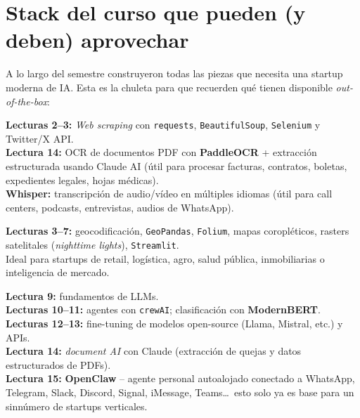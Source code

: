 \documentclass[11pt,a4paper]{article}
\begin{document}
\section{Stack del curso que pueden (y deben) aprovechar}\label{sec:tooling}

A lo largo del semestre construyeron todas las piezas que necesita una startup
moderna de IA. Esta es la chuleta para que recuerden qu\'e tienen disponible
\emph{out-of-the-box}:

\begin{tcolorbox}[ycbox={Datos e ingesta}]
\textbf{Lecturas 2--3:} \emph{Web scraping} con \texttt{requests}, \texttt{BeautifulSoup},
\texttt{Selenium} y Twitter/X API.\\
\textbf{Lectura 14:} OCR de documentos PDF con \textbf{PaddleOCR} + extracci\'on
estructurada usando Claude AI (\'util para procesar facturas, contratos,
boletas, expedientes legales, hojas m\'edicas).\\
\textbf{Whisper:} transcripci\'on de audio/v\'ideo en m\'ultiples idiomas
(\'util para call centers, podcasts, entrevistas, audios de WhatsApp).
\end{tcolorbox}

\begin{tcolorbox}[ycbox={Geoespacial y visualizaci\'on}]
\textbf{Lecturas 3--7:} geocodificaci\'on, \texttt{GeoPandas}, \texttt{Folium},
mapas coropl\'eticos, rasters satelitales (\emph{nighttime lights}), \texttt{Streamlit}.\\
Ideal para startups de retail, log\'istica, agro, salud p\'ublica, inmobiliarias o
inteligencia de mercado.
\end{tcolorbox}

\begin{tcolorbox}[ycbox={Inteligencia Artificial}]
\textbf{Lectura 9:} fundamentos de LLMs.\\
\textbf{Lecturas 10--11:} agentes con \texttt{crewAI}; clasificaci\'on con \textbf{ModernBERT}.\\
\textbf{Lecturas 12--13:} fine-tuning de modelos open-source (Llama, Mistral, etc.) y APIs.\\
\textbf{Lectura 14:} \emph{document AI} con Claude (extracci\'on de quejas y datos
estructurados de PDFs).\\
\textbf{Lectura 15:} \textbf{OpenClaw} -- agente personal autoalojado conectado a
WhatsApp, Telegram, Slack, Discord, Signal, iMessage, Teams\ldots\ esto solo
ya es base para un sinn\'umero de startups verticales.
\end{tcolorbox}
\end{document}
